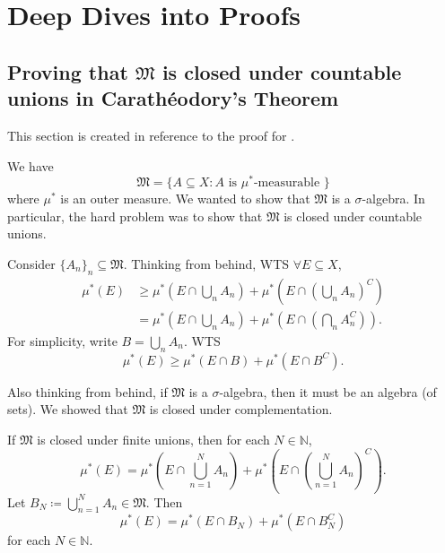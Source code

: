 \documentclass[notoc,notitlepage]{tufte-book}
\begin{document}


\appendix

\chapter{Deep Dives into Proofs}%
\label{chp:deep_dives_into_proofs}

\section{Proving that \texorpdfstring{$\mathfrak{M}$}{M} is closed under countable unions in Carath\'{e}odory's Theorem}\label{sec:proving_that_m_is_closed_under_countable_unions_in_caratheodory_s_theorem}

This section is created in reference to
the proof for .

We have
\begin{equation*}
  \mathfrak{M} = \{ A \subseteq X : A \text{ is } \mu^*\text{-measurable } \}
\end{equation*}
where $\mu^*$ is an outer measure.
We wanted to show that $\mathfrak{M}$ is a $\sigma$-algebra.
In particular, the hard problem was to show that
$\mathfrak{M}$ is closed under countable unions.

Consider $\{ A_n \}_{n} \subseteq \mathfrak{M}$.
Thinking from behind, WTS $\forall E \subseteq X$,
\begin{align*}
  \mu^*(E)
  &\geq \mu^* \left( E \cap \bigcup_{n} A_n \right)
    + \mu^* \left( E \cap \left( \bigcup_{n} A_n \right)^C \right) \\
  &= \mu^* \left( E \cap \bigcup_{n} A_n \right)
    + \mu^* \left( E \cap \left( \bigcap_{n} A_n^C \right) \right).
\end{align*}
For simplicity, write $B = \bigcup_{n} A_n$.
WTS
\begin{equation}\tag{$*$}\label{eq:appendix_1_eq_1}
  \mu^*(E) \geq \mu^*(E \cap B) + \mu^*(E \cap B^C).
\end{equation}

Also thinking from behind,
if $\mathfrak{M}$ is a $\sigma$-algebra, 
then it must be an algebra (of sets).
We showed that $\mathfrak{M}$ is closed under complementation.

If $\mathfrak{M}$ is closed under finite unions,
then for each $N \in \mathbb{N}$,
\begin{equation*}
  \mu^*(E) = \mu^* \left( E \cap \bigcup_{n=1}^{N} A_n \right)
    + \mu^* \left( E \cap \left( \bigcup_{n=1}^{N} A_n \right)^C \right).
\end{equation*}
Let $B_N \coloneqq \bigcup_{n=1}^{N} A_n \in \mathfrak{M}$. Then
\begin{equation}\tag{$\dagger$}\label{eq:appendix_1_eq_2}
  \mu^*(E) = \mu^* (E \cap B_N) + \mu^* (E \cap B_N^C)
\end{equation}
for each $N \in \mathbb{N}$.
\end{document}
